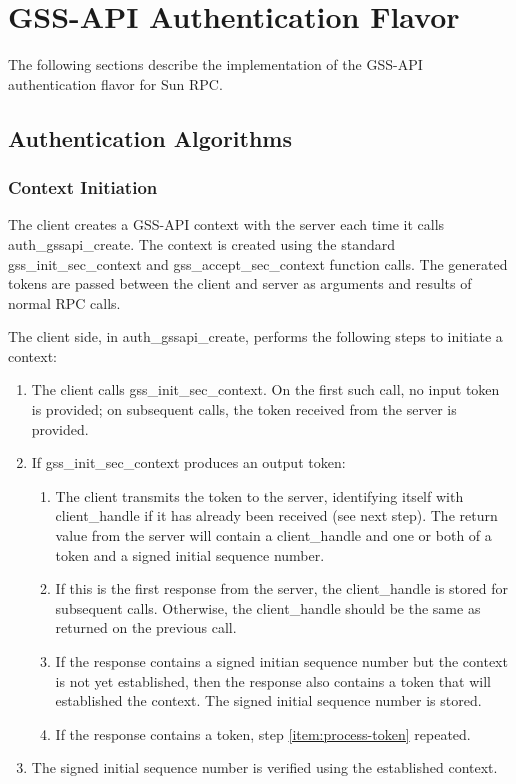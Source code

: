 \section{GSS-API Authentication Flavor}

The following sections describe the implementation of the GSS-API
authentication flavor for Sun RPC.

\subsection{Authentication Algorithms}
\label{sec:algorithms}

\subsubsection{Context Initiation}

The client creates a GSS-API context with the server each time it
calls auth_gssapi_create.  The context is created using the standard
gss_init_sec_context and gss_accept_sec_context function calls.  The
generated tokens are passed between the client and server as arguments
and results of normal RPC calls.

The client side, in auth_gssapi_create, performs the following steps
to initiate a context:

\begin{enumerate}
\item\label{item:process-token} The client calls gss_init_sec_context.
On the first such call, no input token is provided; on subsequent
calls, the token received from the server is provided.

\item If gss_init_sec_context produces an output token:

\begin{enumerate}
\item The client transmits the token to the server, identifying itself
with client_handle if it has already been received (see next step).
The return value from the server will contain a client_handle and one
or both of a token and a signed initial sequence number.  

\item If this is the first response from the server, the client_handle
is stored for subsequent calls.  Otherwise, the client_handle should be
the same as returned on the previous call.

\item If the response contains a signed initian sequence number but
the context is not yet established, then the response also contains a
token that will established the context.  The signed initial sequence
number is stored.

\item If the response contains a token, step \ref{item:process-token}
repeated.
\end{enumerate}

\item The signed initial sequence number is verified using the
established context.
\end{enumerate}


